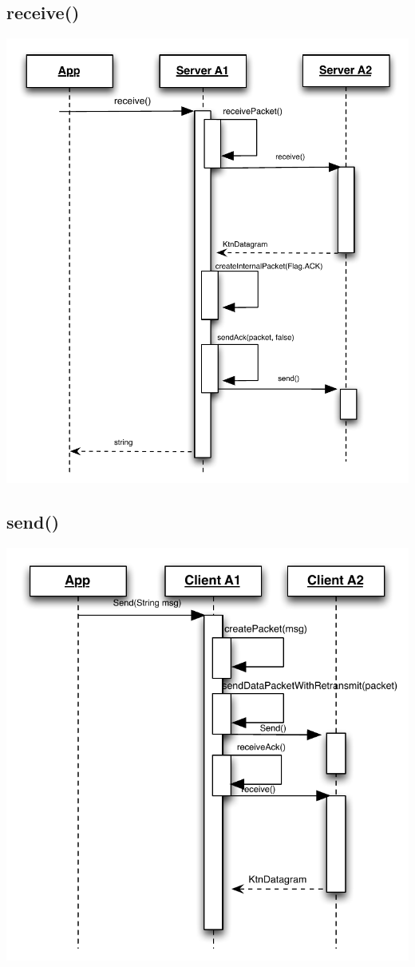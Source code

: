 \documentclass{article}
\begin{document}
\subsection{receive()}
\includegraphics[scale=0.8]{ktnRecv.pdf}
\subsection{send()}
\includegraphics[scale=0.8]{ktnSend.pdf}
\newpage
\end{document}
